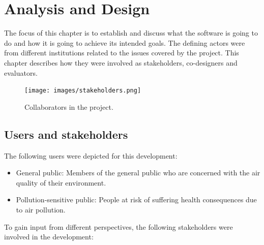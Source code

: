 \chapter{Analysis and Design}
The focus of this chapter is to establish and discuss what the software is going to do and how it is going to achieve its intended goals. The defining actors were from different institutions related to the issues covered by the project. This chapter describes how they were involved as stakeholders, co-designers and evaluators. 

\begin{figure}[h]
\begin{adjustbox}{width=1\textwidth,center=\textwidth}
  \centering
  \texttt{[image: images/stakeholders.png]}
\end{adjustbox}
  \caption[Colaborators in the project]{Collaborators in the project.}
  \label{fig:stakeholders}
\end{figure}

\section{Users and stakeholders}

The following users were depicted for this development:

\begin{itemize}
    \item General public: Members of the general public who are concerned with the air quality of their environment.
    \item Pollution-sensitive public: People at risk of suffering health consequences due to air pollution.
\end{itemize}

To gain input from different perspectives, the following stakeholders were involved in the development: 

